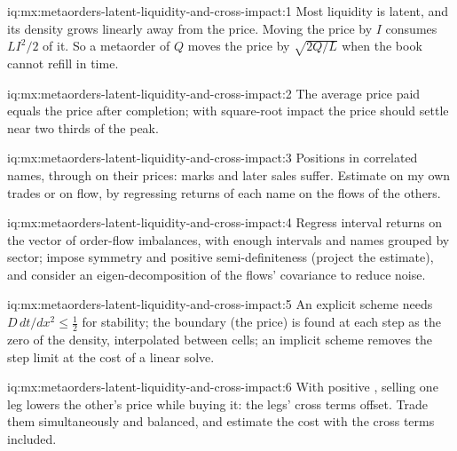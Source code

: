 \begin{solution}{iq:mx:metaorders-latent-liquidity-and-cross-impact:1}
Most liquidity is latent, and its density grows linearly away from the price. Moving the price by $I$ consumes $LI^2/2$ of it. So a metaorder of $Q$
moves the price by $\sqrt{2Q/L}$ when the book cannot refill in time.
\end{solution}

\begin{solution}{iq:mx:metaorders-latent-liquidity-and-cross-impact:2}
The average price paid equals the price after completion; with square-root impact the price should settle near two thirds of the peak.
\end{solution}

\begin{solution}{iq:mx:metaorders-latent-liquidity-and-cross-impact:3}
Positions in correlated names, through  on their prices: marks and later sales suffer. Estimate  on my own trades or on  flow, by regressing returns of each name on the flows of the others.
\end{solution}

\begin{solution}{iq:mx:metaorders-latent-liquidity-and-cross-impact:4}
Regress interval returns on the vector of order-flow imbalances, with enough intervals and names grouped by sector; impose symmetry and positive
semi-definiteness (project the estimate), and consider an eigen-decomposition of the flows' covariance to reduce noise.
\end{solution}

\begin{solution}{iq:mx:metaorders-latent-liquidity-and-cross-impact:5}
An explicit scheme needs $D\,dt/dx^2\le\tfrac12$ for stability; the boundary (the price) is found at each step as the zero of the density, interpolated
between cells; an implicit scheme removes the step limit at the cost of a linear solve.
\end{solution}

\begin{solution}{iq:mx:metaorders-latent-liquidity-and-cross-impact:6}
With positive , selling one leg lowers the other's price while buying it: the legs' cross terms offset. Trade them simultaneously and
balanced, and estimate the cost with the cross terms included.
\end{solution}
